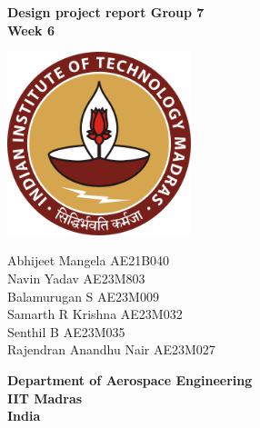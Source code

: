 \documentclass[12 pt]{article}
\begin{document}
\begin{titlepage}
\begin{center}

\textbf{\huge Design project report Group 7 \\ \vspace{0.5 cm} Week 6} \\

\vspace{2 cm}

\centering
\includegraphics[width=0.4\textwidth]{IIT_Madras_Logo.svg.png}
\label{fig:my_label}

\vspace{2 cm}

\Large{Abhijeet Mangela AE21B040 \\ \vspace{0.2 cm} Navin Yadav AE23M803 \\ \vspace{0.2 cm} Balamurugan S AE23M009 \\ \vspace{0.2 cm} Samarth R Krishna AE23M032 \\ \vspace{0.2 cm} Senthil B AE23M035 \\ \vspace{0.2 cm} Rajendran Anandhu Nair AE23M027 }

\vspace{1.0 cm}

\textbf{\Large Department of Aerospace Engineering } \\ \vspace{0.2 cm}
\textbf{\Large IIT Madras} \\ \vspace{0.2 cm}
\textbf{\Large India} \\ 

\normalsize

\end{center}
\end{titlepage}
\end{document}
